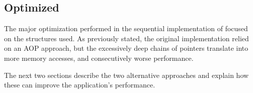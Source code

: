 \subsection{Optimized}


The major optimization performed in the sequential implementation of \polu focused on the structures used. As previously stated, the original implementation relied on an AOP approach, but the excessively deep chains of pointers translate into more memory accesses, and consecutively worse performance.

The next two sections describe the two alternative approaches and explain how these can improve the application's performance.



